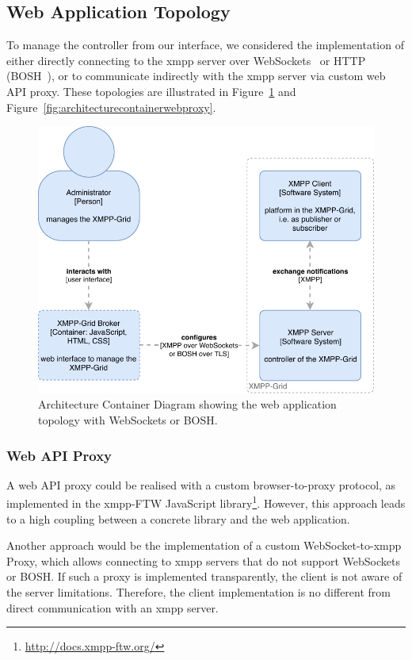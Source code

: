 \subsection{Web Application Topology}

To manage the \gls{controller} from our interface, we considered the implementation of either directly connecting to the \gls{xmpp} server over WebSockets~\cite{rfc7395} or HTTP (BOSH~\cite{xep-0124}), or to communicate indirectly with the \gls{xmpp} server via custom web API proxy.
These topologies are illustrated in Figure~\ref{fig:architecturecontainerwebapplication} and Figure~\ref{fig:architecturecontainerwebproxy}.

\begin{figure}[h]
\centering
\includegraphics[width=0.7\linewidth]{resources/architecture_container_webapplication}
\caption[Architecture Container Diagram: Web Application]{Architecture Container Diagram showing the web application topology with WebSockets or BOSH.}
\label{fig:architecturecontainerwebapplication}
\end{figure}

\subsubsection{Web API Proxy}

A web API proxy could be realised with a custom browser-to-proxy protocol, as implemented in the \gls{xmpp}-FTW JavaScript library\footnote{\url{http://docs.xmpp-ftw.org/}}.
However, this approach leads to a high coupling between a concrete library and the web application.

Another approach would be the implementation of a custom WebSocket-to-\gls{xmpp} Proxy, which allows connecting to \gls{xmpp} servers that do not support WebSockets or BOSH.
If such a proxy is implemented transparently, the client is not aware of the server limitations.
Therefore, the client implementation is no different from direct communication with an \gls{xmpp} server.

